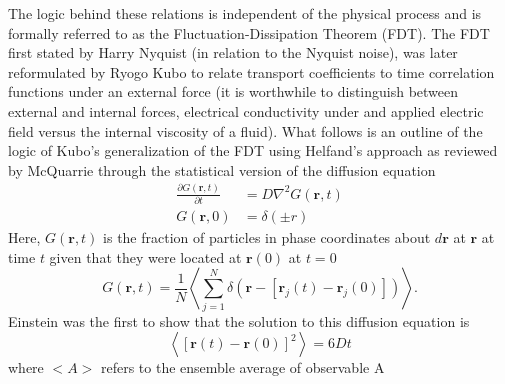 The logic behind these relations is independent of the physical process and is formally referred to as the Fluctuation-Dissipation Theorem (FDT). The FDT first stated by Harry Nyquist (in relation to the Nyquist noise), was later reformulated by Ryogo Kubo to relate transport coefficients to time correlation functions \cite{JPSJ.12.570} under an external force (it is worthwhile to distinguish between external and internal forces, electrical conductivity under and applied electric field versus the internal viscosity of a fluid)\cite{zwanzig1965time}. What follows is an outline of the logic of Kubo's generalization of the FDT using Helfand's approach as reviewed by McQuarrie\cite{mcquarrie2000statistical} through the statistical version of the diffusion equation
%
\begin{equation}
\begin{split}
	\frac{\partial G(\bm{r},t)}{\partial t}&= D \nabla ^2G(\bm{r},t)\\
G(\bm{r},0)&=\delta(\pm{r})
\end{split}
\end{equation}
%
Here, $G(\bm{r},t)$ is the fraction of particles in phase coordinates about $d\bm{r}$ at $\bm{r}$ at time $t$ given that they were located at $\bm{r}(0)$ at $t=0$
%
\begin{equation}
G(\bm{r},t)= \frac{1}{N}\left<\sum_{j=1}^N\delta(\bm{r}-[\bm{r}_j(t)-\bm{r}_j(0)])\right>.
\end{equation}
%
Einstein was the first to show that the solution to this diffusion equation is \cite{}
%
\begin{equation} \label{EQ:Einstein}
\left<[\bm{r}(t)-\bm{r}(0)]^2\right>=6Dt
\end{equation}
%
%
%
where $<A>$ refers to the ensemble average of observable A

